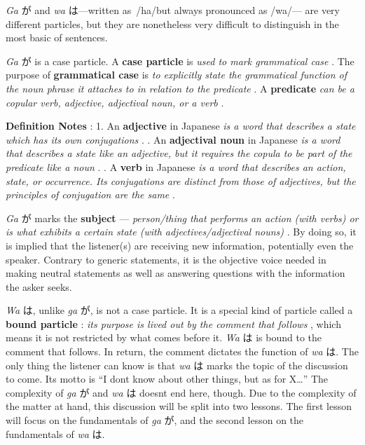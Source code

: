 \par{\emph{ Ga }が and \emph{wa }は—written as \slash ha\slash  but always pronounced as \slash wa\slash  — are very different particles, but they are nonetheless very difficult to distinguish in the most basic of sentences. }

\par{\emph{ Ga }が is a case particle. A \textbf{case particle }is \emph{used to mark grammatical case }. The purpose of \textbf{grammatical case }is \emph{to explicitly state the grammatical function of the noun phrase it attaches to in relation to the predicate }. A  \textbf{predicate } \emph{can be a copular verb, adjective, adjectival noun, or a verb }. }

\par{\textbf{Definition Notes }: }
1. An \textbf{adjective }in Japanese \emph{is a word that describes a state which has its own conjugations }. \hfill{}. An \textbf{adjectival noun }in Japanese \emph{is a word that describes a state like an adjective, but it requires the copula to be part of the predicate like a noun }. \hfill{}. A \textbf{verb }in Japanese \emph{is a word that describes an action, state, or occurrence. Its conjugations are distinct from those of adjectives, but the principles of conjugation are the same }. 
\par{\emph{ Ga }が marks the \textbf{subject }— \emph{person\slash thing that performs an action (with verbs) or is what exhibits a certain state (with adjectives\slash adjectival nouns) }. By doing so, it is implied that the listener(s) are receiving new information, potentially even the speaker. Contrary to generic statements, it is the objective voice needed in making neutral statements as well as answering questions with the information the asker seeks. }

\par{\emph{ Wa }は, unlike \emph{ga }が, is not a case particle. It is a special kind of particle called a \textbf{bound particle }: \emph{its purpose is lived out by the comment that follows }, which means it is not restricted by what comes before it. \emph{Wa }は is bound to the comment that follows. In return, the comment dictates the function of \emph{wa }は. The only thing the listener can know is that \emph{wa }は marks the topic of the discussion to come. Its motto is “I don\textquotesingle t know about other things, but as for X…” \hfill\break
 \hfill\break
 The complexity of \emph{ga }が and \emph{wa }は doesn\textquotesingle t end here, though. Due to the complexity of the matter at hand, this discussion will be split into two lessons. The first lesson will focus on the fundamentals of \emph{ga }が, and the second lesson on the fundamentals of \emph{wa }は. }

